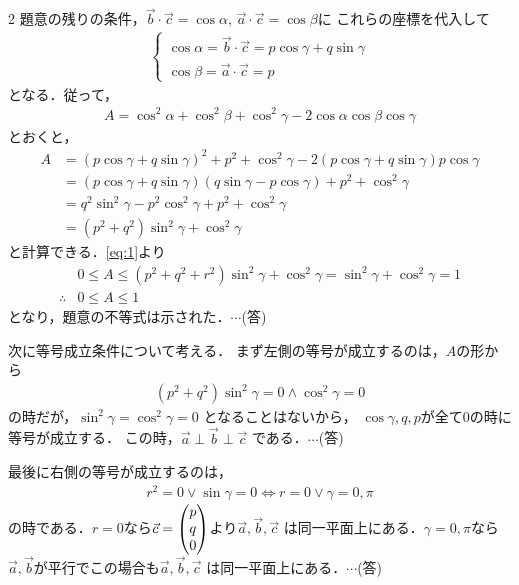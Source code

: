 \documentclass[../../main.tex]{subfiles}
\begin{document}
\begin{multicols}{2}
  題意の残りの条件，$\vec{b}\cdot\vec{c}=\cos\alpha$, $\vec{a}\cdot\vec{c}=\cos\beta$に
  これらの座標を代入して
  \begin{align}
    \begin{cases}
      \cos \alpha = \vec{b} \cdot \vec{c} = p\cos\gamma + q \sin \gamma \\
      \cos \beta = \vec{a} \cdot \vec{c} = p
    \end{cases}
  \end{align}
  となる．従って，
  \begin{align}
    A = \cos^2 \alpha+ \cos^2 \beta + \cos^2 \gamma - 2\cos \alpha \cos \beta \cos \gamma
  \end{align}
  とおくと，
  \begin{align}
    A & = (p\cos\gamma + q \sin\gamma)^2 + p^2 + \cos^2 \gamma - 2(p\cos\gamma + q \sin \gamma) p \cos\gamma \\
    & = (p\cos\gamma + q \sin \gamma)(q \sin \gamma - p\cos\gamma) + p^2 + \cos^2\gamma \\
    & = q^2 \sin^2 \gamma - p^2 \cos^2\gamma + p^2 + \cos^2 \gamma \\
    & = (p^2 + q^2) \sin^2 \gamma + \cos^2 \gamma
  \end{align}
  と計算できる．\cref{eq:1}より
  \begin{align}
    & 0 \le A \le (p^2 + q^2 + r^2) \sin^2 \gamma + \cos^2 \gamma = \sin^2 \gamma + \cos^2 \gamma = 1 \\
    \therefore
    & 0 \le A \le 1
  \end{align}
  となり，題意の不等式は示された．$\cdots$(答)

  次に等号成立条件について考える．
  まず左側の等号が成立するのは，$A$の形から
  \begin{align}
    (p^2+q^2) \sin^2 \gamma = 0 \land \cos^2 \gamma = 0
  \end{align}
  の時だが，$\sin^2 \gamma = \cos^2 \gamma = 0$ となることはないから，
  $\cos\gamma, q, p$が全て$0$の時に等号が成立する．
  この時，$\vec{a} \perp \vec{b} \perp \vec{c}$ である．$\cdots$(答)

  最後に右側の等号が成立するのは，
  \begin{align}
    r^2 = 0 \lor \sin\gamma = 0 \iff r=0 \lor \gamma=0,\pi
  \end{align}
  の時である．$r=0$なら$\vec{c} = \mqty( p \\ q \\ 0)$より$\vec{a}, \vec{b}, \vec{c}$ は同一平面上にある．$\gamma=0,\pi$なら$\vec{a},\vec{b}$が平行でこの場合も$\vec{a}, \vec{b}, \vec{c}$ は同一平面上にある．$\cdots$(答)


\end{multicols}
\end{document}
